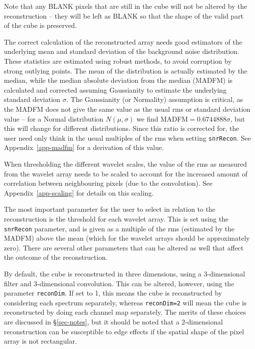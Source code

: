 Note that any BLANK pixels that are still in the cube will not be
altered by the reconstruction -- they will be left as BLANK so that
the shape of the valid part of the cube is preserved.


The correct calculation of the reconstructed array needs good
estimators of the underlying mean and standard deviation of the
background noise distribution. These statistics are estimated using
robust methods, to avoid corruption by strong outlying points. The
mean of the distribution is actually estimated by the median, while
the median absolute deviation from the median (MADFM) is calculated
and corrected assuming Gaussianity to estimate the underlying standard
deviation $\sigma$. The Gaussianity (or Normality) assumption is
critical, as the MADFM does not give the same value as the usual rms
or standard deviation value -- for a Normal distribution
$N(\mu,\sigma)$ we find MADFM$=0.6744888\sigma$, but this will change
for different distributions. Since this ratio is corrected for, the
user need only think in the usual multiples of the rms when setting
\texttt{snrRecon}. See Appendix~\ref{app-madfm} for a derivation of
this value.

When thresholding the different wavelet scales, the value of the rms
as measured from the wavelet array needs to be scaled to account for
the increased amount of correlation between neighbouring pixels (due
to the convolution). See Appendix~\ref{app-scaling} for details on
this scaling.


The most important parameter for the user to select in relation to the
reconstruction is the threshold for each wavelet array. This is set
using the \texttt{snrRecon} parameter, and is given as a multiple of
the rms (estimated by the MADFM) above the mean (which for the wavelet
arrays should be approximately zero). There are several other
parameters that can be altered as well that affect the outcome of the
reconstruction.

By default, the cube is reconstructed in three dimensions, using a
3-dimensional filter and 3-dimensional convolution. This can be
altered, however, using the parameter \texttt{reconDim}. If set to 1,
this means the cube is reconstructed by considering each spectrum
separately, whereas \texttt{reconDim=2} will mean the cube is
reconstructed by doing each channel map separately. The merits of
these choices are discussed in \S\ref{sec-notes}, but it should be
noted that a 2-dimensional reconstruction can be susceptible to edge
effects if the spatial shape of the pixel array is not rectangular.


